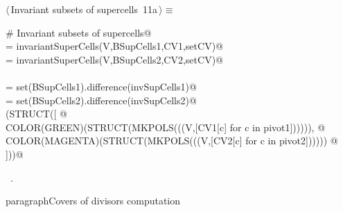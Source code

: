 \documentclass[11pt,oneside]{article}	%
\begin{document}
\begin{flushleft} \small \label{scrap19}
\protect{}$\langle\,$Invariant subsets of supercells\nobreak\ {\footnotesize 11a}$\,\rangle\equiv$
\vspace{-1ex}
\begin{list}{}{} \item
\mbox{}\verb@# Invariant subsets of supercells@\\
\mbox{} = invariantSuperCells(V,BSupCells1,CV1,setCV)@\\
\mbox{} = invariantSuperCells(V,BSupCells2,CV2,setCV)@\\
\mbox{}\verb@@\\
\mbox{} = set(BSupCells1).difference(invSupCells1)@\\
\mbox{} = set(BSupCells2).difference(invSupCells2)@\\
\mbox{}\verb@VIEW(STRUCT([ @\\
\mbox{}\verb@   COLOR(GREEN)(STRUCT(MKPOLS(((V,[CV1[c] for c in pivot1]))))), @\\
\mbox{}\verb@   COLOR(MAGENTA)(STRUCT(MKPOLS(((V,[CV2[c] for c in pivot2]))))) @\\
\mbox{}\verb@]))@\\
\mbox{}\verb@@{\NWsep}
\end{list}
\vspace{-1ex}
\footnotesize\addtolength{\baselineskip}{-1ex}
\begin{list}{}{\setlength{\itemsep}{-\parsep}\setlength{\itemindent}{-\leftmargin}}
\item \NWtxtMacroRefIn\ .
\end{list}
\end{flushleft}
paragraph{Covers of divisors computation}
\end{document}
